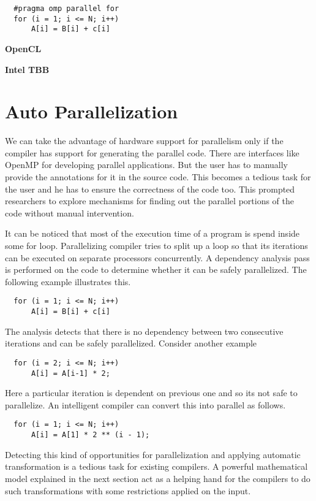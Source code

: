 \documentclass[a4paper,12pt]{book}
\begin{document}
{\footnotesize
\begin{lstlisting}
  #pragma omp parallel for
  for (i = 1; i <= N; i++)
      A[i] = B[i] + c[i]
\end{lstlisting}
}

\textbf{OpenCL}

\textbf{Intel TBB}

\section{Auto Parallelization}
We can take the advantage of hardware support for parallelism only if the compiler has
support for generating the parallel code. There are interfaces like OpenMP for
developing parallel applications. But the user has to manually provide the annotations
for it in the source code. This becomes a tedious task for the user and he has to
ensure the correctness of the code too. This prompted researchers to explore
mechanisms for finding out the parallel portions of the code without manual intervention.

It can be noticed that most of the execution time of a program is spend inside some
for loop. Parallelizing compiler tries to split up a loop so that its iterations can
be executed on separate processors concurrently. A dependency analysis pass is 
performed on the code to determine whether it can be safely parallelized. The following
example illustrates this.

{\footnotesize
\begin{lstlisting}
  for (i = 1; i <= N; i++)
      A[i] = B[i] + c[i]
\end{lstlisting}
}

The analysis detects that there is no dependency between two consecutive iterations and
can be safely parallelized. Consider another example

{\footnotesize
\begin{lstlisting}
  for (i = 2; i <= N; i++)
      A[i] = A[i-1] * 2;
\end{lstlisting}
}

Here a particular iteration is dependent on previous one and so its not safe to parallelize.
An intelligent compiler can convert this into parallel as follows.

{\footnotesize
\begin{lstlisting}
  for (i = 1; i <= N; i++)
      A[i] = A[1] * 2 ** (i - 1);
\end{lstlisting}
}

Detecting this kind of opportunities for parallelization and applying automatic transformation
is a tedious task for existing compilers. A powerful mathematical model explained in the next
section act as a helping hand for the compilers to do such transformations with some
restrictions applied on the input.
\end{document}
